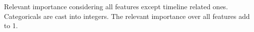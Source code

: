 Relevant importance considering all features except timeline related ones. Categoricals are cast into integers. The relevant importance over all features add to 1.
\label{fig:relevantImportanceNoTimelines}